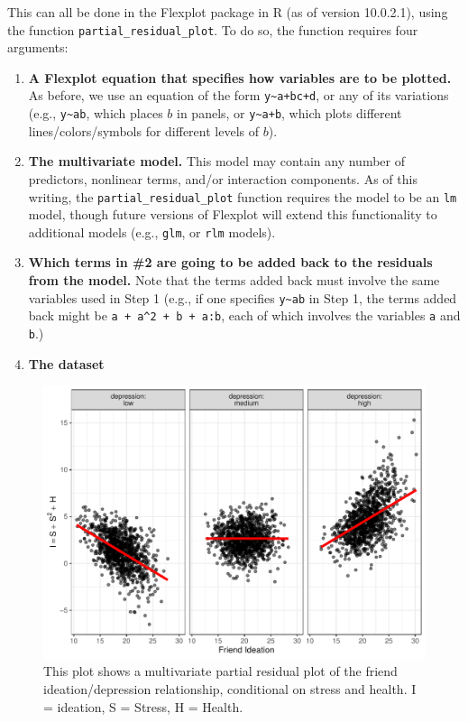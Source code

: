 \documentclass[
  man,floatsintext]{apa6}
\providecommand{\tightlist}{%
  \setlength{\itemsep}{0pt}\setlength{\parskip}{0pt}}
\begin{document}
This can all be done in the Flexplot package in R (as of version 10.0.2.1), using the function \texttt{partial\_residual\_plot}. To do so, the function requires four arguments:

\begin{enumerate}
\def\labelenumi{\arabic{enumi}.}
\tightlist
\item
  \textbf{A Flexplot equation that specifies how variables are to be plotted.} As before, we use an equation of the form \texttt{y\textasciitilde{}a+b\textbar{}c+d}, or any of its variations (e.g., \texttt{y\textasciitilde{}a\textbar{}b}, which places \(b\) in panels, or \texttt{y\textasciitilde{}a+b}, which plots different lines/colors/symbols for different levels of \(b\)).
\item
  \textbf{The multivariate model.} This model may contain any number of predictors, nonlinear terms, and/or interaction components. As of this writing, the \texttt{partial\_residual\_plot} function requires the model to be an \texttt{lm} model, though future versions of Flexplot will extend this functionality to additional models (e.g., \texttt{glm}, or \texttt{rlm} models).
\item
  \textbf{Which terms in \#2 are going to be added back to the residuals from the model.} Note that the terms added back must involve the same variables used in Step 1 (e.g., if one specifies \texttt{y\textasciitilde{}a\textbar{}b} in Step 1, the terms added back might be \texttt{a\ +\ a\^{}2\ +\ b\ +\ a:b}, each of which involves the variables \texttt{a} and \texttt{b}.)
\item
  \textbf{The dataset}
\end{enumerate}

\begin{figure}

{\centering \includegraphics[width=0.7\linewidth]{visual_partitions_files/figure-latex/prp1a-1} 

}

\caption{This plot shows a multivariate partial residual plot of the friend ideation/depression relationship, conditional on stress and health. I = ideation, S = Stress, H = Health.}\label{fig:prp1a}
\end{figure}
\end{document}
